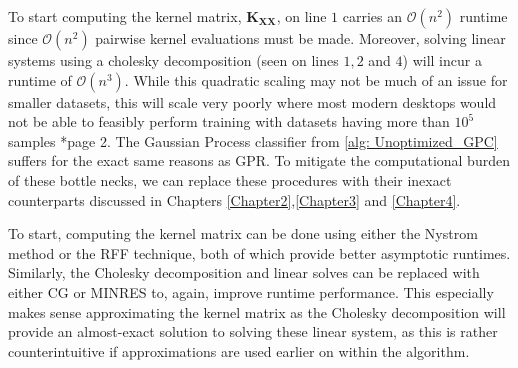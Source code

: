 To start computing the kernel matrix, $\bm{K_{XX}}$, on line $1$ carries an $\mathcal{O} \left( n^2 \right)$ runtime since $\mathcal{O} \left( n^2 \right)$ pairwise kernel evaluations must be made. Moreover, solving linear systems using a cholesky decomposition (seen on lines $1,2$ and $4$) will incur a runtime of $\mathcal{O} \left( n^3 \right)$. While this quadratic scaling may not be much of an issue for smaller datasets, this will scale very poorly where most modern desktops would not be able to feasibly perform training with datasets having more than $10^5$ samples \cite{DBLP:journals/corr/abs-2112-15246}*{page 2}. The Gaussian Process classifier from \cref{alg: Unoptimized_GPC} suffers for the exact same reasons as GPR. To mitigate the computational burden of these bottle necks, we can replace these procedures with their inexact counterparts discussed in Chapters \ref{Chapter2},\ref{Chapter3} and \ref{Chapter4}.

To start, computing the kernel matrix can be done using either the Nystrom method or the RFF technique, both of which provide better asymptotic runtimes. Similarly, the Cholesky decomposition and linear solves can be replaced with either CG or MINRES to, again, improve runtime performance. This especially makes sense approximating the kernel matrix as the Cholesky decomposition will provide an almost-exact solution to solving these linear system, as this is rather counterintuitive if approximations are used earlier on within the algorithm.